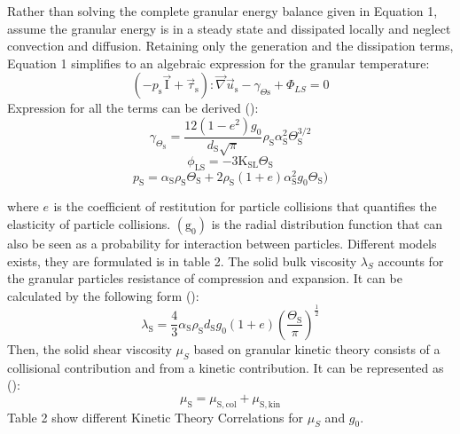 \documentclass[11pt]{report}
\begin{document}
Rather than solving the complete granular energy balance given in Equation 1, \cite{Ekambara-2009} assume the granular energy is in a steady state and dissipated locally and neglect convection and diffusion. 
%
Retaining only the generation and the dissipation terms, Equation 1 simplifies to an algebraic expression for the granular temperature:
%
\begin{equation}
\left(-p_{\mathrm{s}} \overrightarrow{\mathrm{I}}+\vec{\tau}_{\mathrm{s}}\right): \vec{\nabla} \vec{u}_{\mathrm{s}}-\gamma_{\Theta \mathrm{s}}+\Phi_{LS}=0
\end{equation}
%
Expression for all the terms can be derived (\cite{GID-1994}):
%
\begin{equation}
\gamma_{\Theta_{\mathrm{S}}}=\frac{12\left(1-e^{2}\right) g_{0}}{d_{\mathrm{S}} \sqrt{\pi}} \rho_{\mathrm{S}} \alpha_{\mathrm{S}}^{2} \Theta_{\mathrm{S}}^{3 / 2}
\end{equation}
\begin{equation}
\phi_{\mathrm{LS}}=-3 \mathrm{K}_{\mathrm{SL}} \Theta_{\mathrm{S}}
\end{equation}
\begin{equation}
p_{\mathrm{S}}=\alpha_{\mathrm{S}} \rho_{\mathrm{S}} \Theta_{\mathrm{S}}+2 \rho_{\mathrm{S}}\left(1+e\right) \alpha_{\mathrm{S}}^{2} g_{0} \Theta_{\mathrm{S}})
\end{equation}

where \(e_{\mathrm{}}\) is the coefficient of restitution for particle collisions that quantifies the elasticity of particle collisions. 
%
$(\mathrm{g_{0}})$ is the radial distribution function that can also be seen as a probability for interaction between particles. 
%
Different models exists, they are  formulated is in table 2.
%
The solid bulk viscosity $\lambda_S$ accounts for the granular particles resistance of compression and expansion. 
%
It can be calculated by the following form (\citet{Ekambara-2009}):
%
\begin{equation}
\lambda_{\mathrm{S}}=\frac{4}{3} \alpha_{\mathrm{S}} \rho_{\mathrm{S}} d_{\mathrm{S}} g_{0}\left(1+e\right)\left(\frac{\Theta_{\mathrm{S}}}{\pi}\right)^{\frac{1}{2}}
\end{equation}
Then, the solid shear viscosity $\mu_S$ based on granular kinetic theory consists of a collisional contribution and from a kinetic contribution. It can be represented as (\citet{GID-1994}):
\begin{equation}
\mu_{\mathrm{S}}=\mu_{\mathrm{S}, \mathrm{col}}+\mu_{\mathrm{S}, \mathrm{kin}} 
\end{equation}
%
Table 2 show different Kinetic Theory Correlations for $\mu_S$ and $g_0$.
\end{document}

